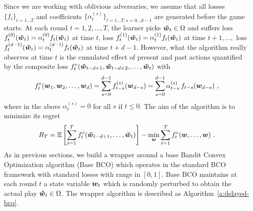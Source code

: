 Since we are working with oblivious adversaries, we assume that all losses $\{f_{t}\}_{t=1\dots T}$ and coefficients $\{\alpha^{(s)}_{t}\}_{t=1\dots T,s=0\dots d-1}$ are generated before the game starts. At each round $t= 1, 2, \ldots, T$, the learner picks $\boldsymbol{{\tilde w}}_t \in \Omega$ and suffers loss $f^{(0)}_t(\boldsymbol{{\tilde w}}_t) = \alpha^{(0)}_{t}f_t(\boldsymbol{{\tilde w}}_t)$ at time $t$, loss $f^{(1)}_{t}(\boldsymbol{{\tilde w}}_t) =  \alpha^{(1)}_{t} f_{t}(\boldsymbol{{\tilde w}}_t)$ at time $t+1,\ldots,$ loss $f^{(d-1)}_t(\boldsymbol{{\tilde w}}_t) =  \alpha^{(d-1)}_{t}f_t(\boldsymbol{{\tilde w}}_t)$ at time $t+d-1$. However, what the algorithm really observes at time $t$ is the cumulated effect of present and past actions quantified by the composite loss
\(
f^{\circ}_t(\boldsymbol{{\tilde w}}_{t-d+1},\boldsymbol{{\tilde w}}_{t-d+2},\ldots, \boldsymbol{{\tilde w}}_t)
\)
with
\[
f^{\circ}_t(\boldsymbol{w}_{1},\boldsymbol{w}_{2},\ldots, \boldsymbol{w}_d)= \sum_{s=0}^{d-1} f_{t-s}^{(s)}(\boldsymbol{w}_{d-s}) = \sum_{s=0}^{d-1} \alpha_{t-s}^{(s)}\,f_{t-s}(\boldsymbol{w}_{d-s})~,
\]
where in the above $\alpha_t^{(s)} = 0$ for all $s$ if $t \leq 0$.
The aim of the algorithm is to minimize its regret
\[
    R_T =\mathbb{E}\left[\sum_{t=1}^T f^{\circ}_t(\boldsymbol{{\tilde w}}_{t-d+1},\dots,\boldsymbol{{\tilde w}}_t)\right] - \min_{\boldsymbol{w}} \sum_{t=1}^T f^{\circ}_t(\boldsymbol{w},\dots,\boldsymbol{w})~.
\]
As in previous sections, we build a wrapper around a base Bandit Convex Optimization algorithm (Base BCO) which operates in the standard BCO framework with standard losses with range in $[0,1]$. Base BCO maintains at each round $t$ a state variable $\boldsymbol{w}_t$ which is randomly perturbed to obtain the actual play $\boldsymbol{{\tilde w}}_t \in \Omega$. The wrapper algorithm is described as Algorithm~\ref{a:delayed-bco}.
%

